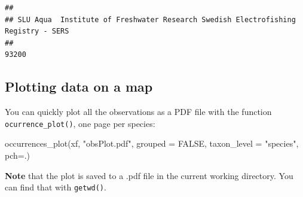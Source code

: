 \documentclass[
  10pt,
]{article}
\newenvironment{Shaded}{\begin{snugshade}}{\end{snugshade}}
\newcommand{\AttributeTok}[1]{\textcolor[rgb]{0.77,0.63,0.00}{#1}}
\newcommand{\CommentTok}[1]{\textcolor[rgb]{0.56,0.35,0.01}{\textit{#1}}}
\newcommand{\ConstantTok}[1]{\textcolor[rgb]{0.00,0.00,0.00}{#1}}
\newcommand{\DecValTok}[1]{\textcolor[rgb]{0.00,0.00,0.81}{#1}}
\newcommand{\FunctionTok}[1]{\textcolor[rgb]{0.00,0.00,0.00}{#1}}
\newcommand{\NormalTok}[1]{#1}
\newcommand{\OtherTok}[1]{\textcolor[rgb]{0.56,0.35,0.01}{#1}}
\newcommand{\SpecialCharTok}[1]{\textcolor[rgb]{0.00,0.00,0.00}{#1}}
\newcommand{\StringTok}[1]{\textcolor[rgb]{0.31,0.60,0.02}{#1}}
\begin{document}
\begin{Shaded}
\end{Shaded}

\begin{verbatim}
## 
## SLU Aqua  Institute of Freshwater Research Swedish Electrofishing Registry - SERS 
##                                                                             93200
\end{verbatim}

\hypertarget{plotting-data-on-a-map}{%
\subsection{Plotting data on a map}\label{plotting-data-on-a-map}}

You can quickly plot all the observations as a PDF file with the function \texttt{ocurrence\_plot()}, one page per species:

\begin{Shaded}
\begin{Highlighting}[]
\FunctionTok{occurrences\_plot}\NormalTok{(xf, }\StringTok{"obsPlot.pdf"}\NormalTok{, }
                 \AttributeTok{grouped =} \ConstantTok{FALSE}\NormalTok{, }
                 \AttributeTok{taxon\_level =} \StringTok{"species"}\NormalTok{, }
                 \AttributeTok{pch=}\StringTok{\textquotesingle{}.\textquotesingle{}}\NormalTok{)}
\end{Highlighting}
\end{Shaded}

\textbf{Note} that the plot is saved to a .pdf file in the current working directory. You can find that with \texttt{getwd()}.
\end{document}
